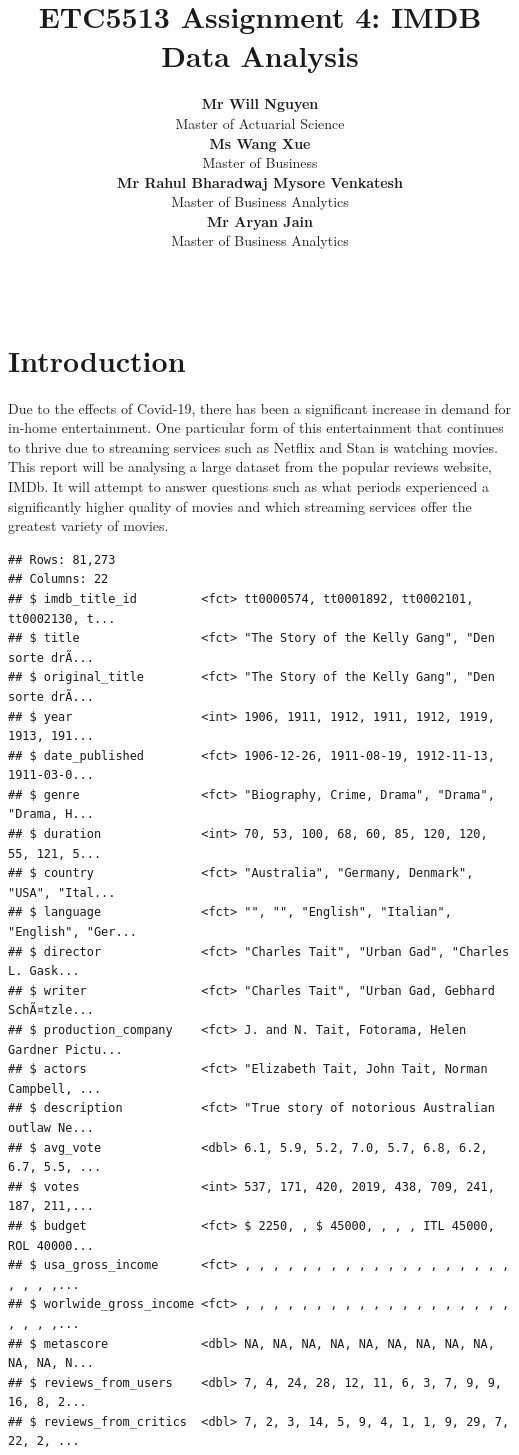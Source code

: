 \documentclass[11pt,a4paper,]{article}
\title{ETC5513 Assignment 4: IMDB Data Analysis}
\author{\sf\Large\textbf{Mr Will Nguyen}\\ {\sf\large Master of Actuarial Science\\[0.5cm]} \sf\Large\textbf{Ms Wang Xue}\\ {\sf\large Master of Business\\[0.5cm]} \sf\Large\textbf{Mr Rahul Bharadwaj Mysore Venkatesh}\\ {\sf\large Master of Business Analytics\\[0.5cm]} \sf\Large\textbf{Mr Aryan Jain}\\ {\sf\large Master of Business Analytics\\[0.5cm]}}
\date{\sf\Date~\Month~\Year}
\makeatletter
\def\titlepage{\front{\expandafter{\@title}}{\@author}{\@organization}}
\makeatother
\begin{document}
\titlepage

\hypertarget{introduction}{%
\section{Introduction}\label{introduction}}

Due to the effects of Covid-19, there has been a significant increase in demand for in-home entertainment. One particular form of this entertainment that continues to thrive due to streaming services such as Netflix and Stan is watching movies. This report will be analysing a large dataset from the popular reviews website, IMDb. It will attempt to answer questions such as what periods experienced a significantly higher quality of movies and which streaming services offer the greatest variety of movies.

\begin{verbatim}
## Rows: 81,273
## Columns: 22
## $ imdb_title_id         <fct> tt0000574, tt0001892, tt0002101, tt0002130, t...
## $ title                 <fct> "The Story of the Kelly Gang", "Den sorte drÃ...
## $ original_title        <fct> "The Story of the Kelly Gang", "Den sorte drÃ...
## $ year                  <int> 1906, 1911, 1912, 1911, 1912, 1919, 1913, 191...
## $ date_published        <fct> 1906-12-26, 1911-08-19, 1912-11-13, 1911-03-0...
## $ genre                 <fct> "Biography, Crime, Drama", "Drama", "Drama, H...
## $ duration              <int> 70, 53, 100, 68, 60, 85, 120, 120, 55, 121, 5...
## $ country               <fct> "Australia", "Germany, Denmark", "USA", "Ital...
## $ language              <fct> "", "", "English", "Italian", "English", "Ger...
## $ director              <fct> "Charles Tait", "Urban Gad", "Charles L. Gask...
## $ writer                <fct> "Charles Tait", "Urban Gad, Gebhard SchÃ¤tzle...
## $ production_company    <fct> J. and N. Tait, Fotorama, Helen Gardner Pictu...
## $ actors                <fct> "Elizabeth Tait, John Tait, Norman Campbell, ...
## $ description           <fct> "True story of notorious Australian outlaw Ne...
## $ avg_vote              <dbl> 6.1, 5.9, 5.2, 7.0, 5.7, 6.8, 6.2, 6.7, 5.5, ...
## $ votes                 <int> 537, 171, 420, 2019, 438, 709, 241, 187, 211,...
## $ budget                <fct> $ 2250, , $ 45000, , , , ITL 45000, ROL 40000...
## $ usa_gross_income      <fct> , , , , , , , , , , , , , , , , , , , , , , ,...
## $ worlwide_gross_income <fct> , , , , , , , , , , , , , , , , , , , , , , ,...
## $ metascore             <dbl> NA, NA, NA, NA, NA, NA, NA, NA, NA, NA, NA, N...
## $ reviews_from_users    <dbl> 7, 4, 24, 28, 12, 11, 6, 3, 7, 9, 9, 16, 8, 2...
## $ reviews_from_critics  <dbl> 7, 2, 3, 14, 5, 9, 4, 1, 1, 9, 29, 7, 22, 2, ...
\end{verbatim}
\end{document}

